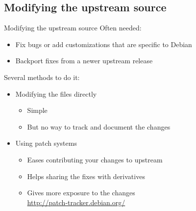 \documentclass[10pt,final]{beamer}
\begin{document}
\subsection{Modifying the upstream source}
\begin{frame}{Modifying the upstream source}
  Often needed:
  \begin{itemize}
  \item Fix bugs or add customizations that are specific to Debian
    \hbr
  \item Backport fixes from a newer upstream release
  \end{itemize}
  \br
  Several methods to do it:
  \begin{itemize}
  \item Modifying the files directly
    \begin{itemize}
    \item Simple
    \item But no way to track and document the changes
    \end{itemize}
    \hbr
  \item Using patch systems
    \begin{itemize}
    \item Eases contributing your changes to upstream
    \item Helps sharing the fixes with derivatives
    \item Gives more exposure to the changes\\
      \url{http://patch-tracker.debian.org/}
    \end{itemize}
  \end{itemize}
\end{frame}
\end{document}
